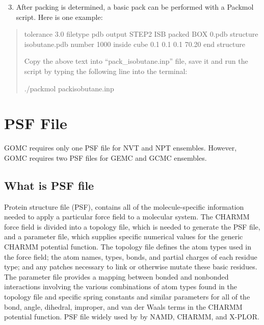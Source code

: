\documentclass[letterpaper,10pt,english]{sphinxmanual}
\begin{document}
\begin{enumerate}
\setcounter{enumi}{2}
\item {} 
After packing is determined, a basic pack can be performed with a Packmol script. Here is one example:

\end{enumerate}
\begin{quote}

%
\begin{sphinxVerbatim}[commandchars=\\\{\}]
tolerance 3.0
filetype pdb
output STEP2 ISB packed BOX 0.pdb
structure isobutane.pdb
number 1000
inside cube 0.1 0.1 0.1 70.20
end structure
\end{sphinxVerbatim}

Copy the above text into “pack\_isobutane.inp” file, save it and run the script by typing the following line into the terminal:

%
\begin{sphinxVerbatim}[commandchars=\\\{\}]
\PYGZdl{} ./packmol \PYGZlt{} pack\PYGZus{}isobutane.inp
\end{sphinxVerbatim}
\end{quote}


\section{PSF File}
\label{\detokenize{input_file:psf-file}}
GOMC requires only one PSF file for NVT and NPT ensembles. However, GOMC requires two PSF files for GEMC and GCMC ensembles.


\subsection{What is PSF file}
\label{\detokenize{input_file:what-is-psf-file}}
Protein structure file (PSF), contains all of the molecule-specific information needed to apply a particular force field to a molecular system. The CHARMM force field is divided into a topology file, which is needed to generate the PSF file, and a parameter file, which supplies specific numerical values for the generic CHARMM potential function. The topology file defines the atom types used in the force field; the atom names, types, bonds, and partial charges of each residue type; and any patches necessary to link or otherwise mutate these basic residues. The parameter file provides a mapping between bonded and nonbonded interactions involving the various combinations of atom types found in the topology file and specific spring constants and similar parameters for all of the bond, angle, dihedral, improper, and van der Waals terms in the CHARMM potential function. PSF file widely used by by NAMD, CHARMM, and X-PLOR.
\end{document}
